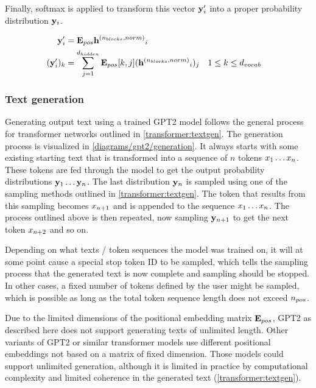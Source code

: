 Finally, softmax is applied to transform this vector ${\mathbf{y}}'_i$ into a proper probability distribution ${\mathbf{y}}_i$.

\begin{equation}
	\begin{aligned}
		{\mathbf{y}}'_i &= {\mathbf{E}_{pos}} {\mathbf{h}^{({n_{blocks}}, norm)}}_i \\
		({\mathbf{y}}'_i)_k &= \sum_{j=1}^{{d_{hidden}}}{{{\mathbf{E}_{pos}}[k,j]} ({\mathbf{h}^{({n_{blocks}}, norm)}}_i)_j} && 1 \leq k \leq {d_{vocab}}
	\end{aligned}
	\label{eq:postproc}
\end{equation}



\subsubsection{Text generation}
\label{gpt2:textgen}

Generating output text using a trained GPT2 model follows the general process for transformer networks outlined in \cref{transformer:textgen}.
The generation process is visualized in \cref{diagrams/gpt2/generation}. It always starts with some existing starting text that is transformed into a sequence of $n$ tokens ${x}_1 \ldots {x}_n$. These tokens are fed through the model to get the output probability distributions ${\mathbf{y}}_1 \ldots {\mathbf{y}}_n$. The last distribution ${\mathbf{y}}_n$ is sampled using one of the sampling methods outlined in \cref{transformer:textgen}. The token that results from this sampling becomes ${x}_{n+1}$ and is appended to the sequence ${x}_1 \ldots {x}_n$. The process outlined above is then repeated, now sampling ${\mathbf{y}}_{n+1}$ to get the next token ${x}_{n+2}$ and so on.

Depending on what texts / token sequences the model was trained on, it will at some point cause a special stop token ID to be sampled, which tells the sampling process that the generated text is now complete and sampling should be stopped.
In other cases, a fixed number of tokens defined by the user might be sampled, which is possible as long as the total token sequence length does not exceed ${n_{pos}}$.

Due to the limited dimensions of the positional embedding matrix ${\mathbf{E}_{pos}}$, GPT2 as described here does not support generating texts of unlimited length. Other variants of GPT2 or similar transformer models use different positional embeddings not based on a matrix of fixed dimension. Those models could support unlimited generation, although it is limited in practice by computational complexity and limited coherence in the generated text (\cref{transformer:textgen}).

